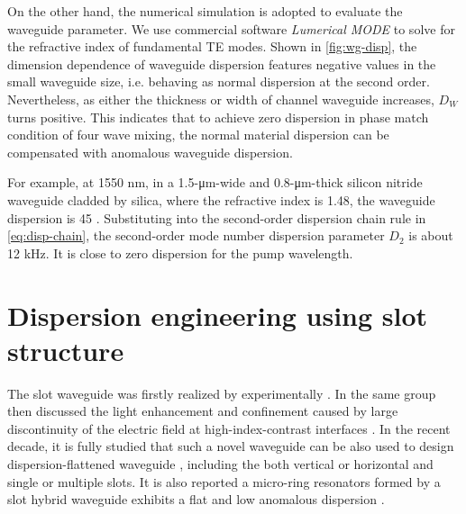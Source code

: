 \begin{figure}
    \centering
    
    \label{fig:Luke-si3n4}
\end{figure}

On the other hand, the numerical simulation is adopted to evaluate the waveguide parameter.
We use commercial software \textit{Lumerical MODE} to solve for the refractive index of fundamental TE modes.
Shown in \autoref{fig:wg-disp}, the dimension dependence of waveguide dispersion features negative values in the small waveguide size, i.e. behaving as normal dispersion at the second order. Nevertheless, as either the thickness or width of channel waveguide increases,
$D_W$ turns positive. This indicates that to achieve zero dispersion in phase match condition of four wave mixing, the normal material dispersion can be compensated with anomalous waveguide dispersion. 

For example, at 1550 \si{\nm}, in a 1.5-\si{\um}-wide and 0.8-\si{\um}-thick silicon nitride waveguide cladded by silica, where the refractive index is 1.48,
the waveguide dispersion is 45 \dispu. Substituting into the second-order dispersion chain rule in \autoref{eq:disp-chain}, the second-order mode number dispersion parameter $ D_2 $ is about 12 kHz. It is close to zero dispersion for the pump wavelength.

\begin{figure}
	\centering
	
	\label{fig:wg-disp}
\end{figure}

\section{Dispersion engineering using slot structure}

The slot waveguide was firstly realized by \citeauthor{Xu2004} experimentally \cite{Xu2004}. In the same group \citeauthor{Almeida2004} then discussed the light enhancement and confinement caused by large discontinuity of the electric field at high-index-contrast interfaces \cite{Almeida2004}. In the recent decade, it is fully studied that such a novel waveguide can be also used to design dispersion-flattened waveguide \cites{Mas2010, Zhang2010, Zhu2012, Nolte2013}, including the both vertical or horizontal and single or multiple slots. It is also reported a micro-ring resonators formed by a slot hybrid waveguide 
exhibits a flat and low anomalous dispersion \cite{Zhang2013}.

